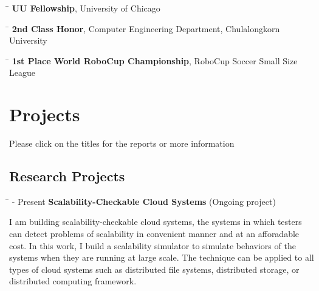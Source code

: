\documentclass[10pt]{article} %
\begin{document}
\begin{tabbing}
\hspace{2.5cm} \=  \> \textbf{UU Fellowship}, University of Chicago
\end{tabbing}

\begin{tabbing}
\hspace{2.5cm} \=  \> \textbf{2nd Class Honor}, Computer Engineering Department, Chulalongkorn University
\end{tabbing}

\begin{tabbing}
\hspace{2.5cm} \=  \> \textbf{1st Place World RoboCup Championship}, RoboCup Soccer Small Size League
\end{tabbing}

\pagebreak


\section{Projects}
\vspace{-4mm}
{\footnotesize Please click on the titles for the reports or more information}

\subsection{Research Projects}

\begin{tabbing}
\hspace{2.5cm} \=  - Present \>\+ \textbf{Scalability-Checkable Cloud Systems} (Ongoing project) \\
\begin{minipage}{\smallertextwidth}
I am building scalability-checkable cloud systems, the systems in which testers
can detect problems of scalability in convenient manner and at an afforadable
cost. In this work, I build a scalability simulator to simulate behaviors of the
systems when they are running at large scale. The technique can be applied to
all types of cloud systems such as distributed file systems, distributed
storage, or distributed computing framework.
\end{minipage}
\end{tabbing}
\end{document}
